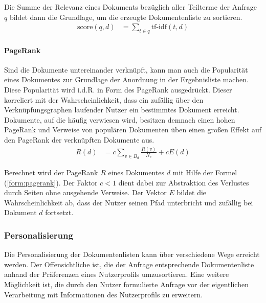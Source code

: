 Die Summe der Relevanz eines Dokuments bezüglich aller Teilterme der Anfrage $q$ bildet dann die Grundlage, um die erzeugte Dokumentenliste zu sortieren.\citep{Manning2008} 
\begin{align}
\text{score}(q,d) & = \sum_{t \in q}{\text{tf-idf}(t,d)}  \label{form:docscore}
\end{align}

\paragraph{PageRank} Sind die Dokumente untereinander verknüpft, kann man auch die Popularität eines Dokumentes zur Grundlage der Anordnung in der Ergebnisliste machen. Diese Popularität wird i.d.R. in Form des PageRank ausgedrückt. Dieser korreliert mit der Wahrscheinlichkeit, dass ein zufällig über den Verknüpfungsgraphen laufender Nutzer ein bestimmtes Dokument erreicht. Dokumente, auf die häufig verwiesen wird, besitzen demnach einen hohen PageRank und Verweise von populären Dokumenten üben einen großen Effekt auf den PageRank der verknüpften Dokumente aus.
\begin{align}
R(d) & = c \sum_{v \in B_d}{\frac{R(v)}{N_v}} + cE(d) \label{form:pagerank}
\end{align}

Berechnet wird der PageRank $R$ eines Dokumentes $d$ mit Hilfe der Formel (\ref{form:pagerank}). Der Faktor $c < 1$ dient dabei zur Abstraktion des Verlustes durch Seiten ohne ausgehende Verweise. Der Vektor $E$ bildet die Wahrscheinlichkeit ab, dass der Nutzer seinen Pfad unterbricht und zufällig bei Dokument $d$ fortsetzt.\citep{pagerank,Manning2008}

\subsubsection{Personalisierung}\label{sec:personalresultstheorie}

Die Personalisierung der Dokumentenlisten kann über verschiedene Wege erreicht werden. Der Offensichtliche ist, die der Anfrage entsprechende Dokumentenliste anhand der Präferenzen eines Nutzerprofils umzusortieren. Eine weitere Möglichkeit ist, die durch den Nutzer formulierte Anfrage vor der eigentlichen Verarbeitung mit Informationen des Nutzerprofils zu erweitern.


